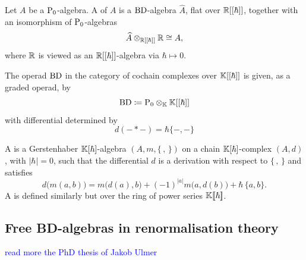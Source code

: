 \begin{definition}
	Let \(A\) be a \(\mathrm{P}_0\)-algebra.
	A  of \(A\) is a  \(\mathrm{BD}\)-algebra \(\widehat{A}\), flat over \(\mathbb{R}[[\hbar]]\), together with an isomorphism of \(\mathrm{P}_0\)-algebras
	\[
	\widehat{A} \otimes_{\mathbb{R}[[\hbar]]} \mathbb{R} \cong A,
	\]
	where \(\mathbb{R}\) is viewed as an \(\mathbb{R}[[\hbar]]\)-algebra via \(\hbar \mapsto 0\).
\end{definition}

The operad \(\mathrm{BD}\) in the category of cochain complexes over \(\mathbb{K}[[\hbar]]\) is given, as a graded operad, by
\[
\mathrm{BD} \coloneqq \mathrm{P}_0 \otimes_{\mathbb{K}} \mathbb{K}[[\hbar]]
\]
with differential determined by
\[
d(- * -) = \hbar\{-,-\}
\]

\begin{definition}[Bruno's]\label{def:BDalg}
	A  is a Gerstenhaber \(\mathbb{K}[\hbar]\)-algebra \((A, m ,\{\, , \,\})\) on a chain \(\mathbb{K}[\hbar]\)-complex \((A,d)\), with \(|\hbar|=0\), such that the differential \(d\) is a derivation with respect to \(\{\, , \,\}\) and satisfies
	\[
	d\bigl(m(a,b)\bigr) = m\bigl(d(a),b\bigr) + (-1)^{|a|} m\bigl(a,d(b)\bigr) + \hbar\,\{a,b\}.
	\]
	A  is defined similarly but over the ring of power series \(\mathbb{K}[\![\hbar]\!]\).
\end{definition}

\subsection{Free BD-algebras in renormalisation theory}
\textcolor{blue}{read more the PhD thesis of Jakob Ulmer}
